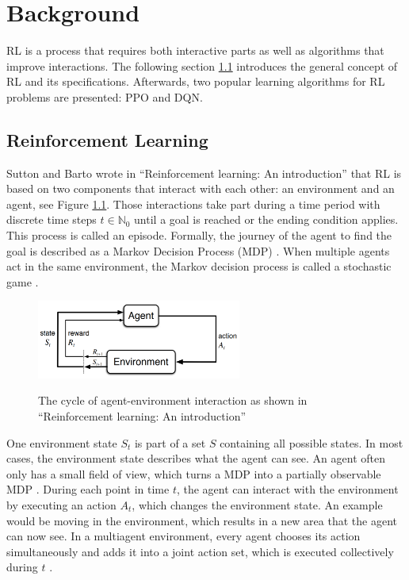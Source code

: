\chapter{Background}\label{sec:Background}
RL is a process that requires both interactive parts as well as algorithms that improve interactions. The following section \ref{reinforcement_learning} introduces the general concept of RL and its specifications. Afterwards, two popular learning algorithms for RL problems are presented: PPO and DQN.

\section{Reinforcement Learning}\label{reinforcement_learning}
Sutton and Barto wrote in ``Reinforcement learning: An introduction'' \cite{suba18} that RL is based on two components that interact with each other: an environment and an agent, see Figure \ref{fig:rl_cycle}. Those interactions take part during a time period with discrete time steps $t\in\mathbb{N}_0$ until a goal is reached or the ending condition applies. This process is called an episode. Formally, the journey of the agent to find the goal is described as a Markov Decision Process (MDP) \cite{suba18}. When multiple agents act in the same environment, the Markov decision process is called a stochastic game \cite{buba10}.

\begin{figure}[hpbt]
    \centering
    \includegraphics[width=0.6\textwidth]{pictures/RLInteractionSB}\\
    \caption[Reinforcement Learning Cycle]{The cycle of agent-environment interaction as
        shown in ``Reinforcement learning: An introduction'' \cite{suba18}}\label{fig:rl_cycle}
\end{figure}

One environment state $S_t$ is part of a set $S$ containing all possible states. In most cases, the environment state describes what the agent can see. An agent often only has a small field of view, which turns a MDP into a partially observable MDP \cite{suba18}. During each point in time $t$, the agent can interact with the environment by executing an action $A_t$, which changes the environment state. An example would be moving in the environment, which results in a new area that the agent can now see. In a multiagent environment, every agent chooses its action simultaneously and adds it into a joint action set, which is executed collectively during $t$ \cite{buba10}.

